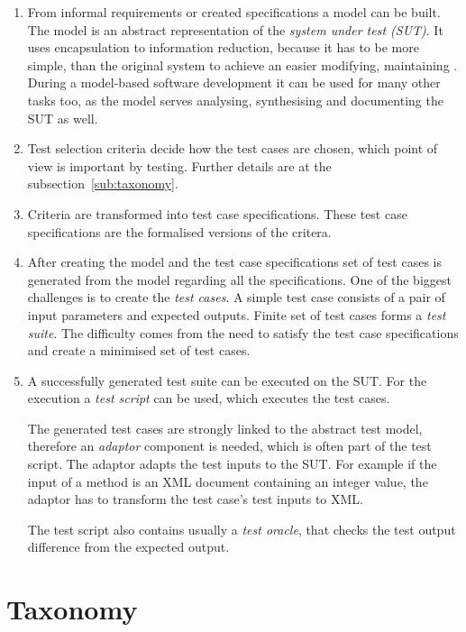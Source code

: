 \begin{enumerate}
    \item From informal requirements or created specifications a model can be built. The model is an abstract representation of the \textit{system under test (SUT)}. It uses encapsulation to information reduction, because it has to be more simple, than the original system to achieve an easier modifying, maintaining \cite{mbttestcasegeneration}. During a model-based software development it can be used for many other tasks too, as the model serves analysing, synthesising and documenting the SUT as well.
     \item Test selection criteria decide how the test cases are chosen, which point of view is important by testing. Further details are at the subsection~\ref{sub:taxonomy}.
     \item Criteria are transformed into test case specifications. These test case specifications are the formalised versions of the critera.
     \item After creating the model and the test case specifications set of test cases is generated from the model regarding all the specifications. One of the biggest challenges is to create the \textit{test cases}. A simple test case consists of a pair of input parameters and expected outputs. Finite set of test cases forms a \textit{test suite}. The difficulty comes from the need to satisfy the test case specifications and create a minimised set of test cases.
     \item A successfully generated test suite can be executed on the SUT. For the execution a \textit{test script} can be used, which executes the test cases.
     
     The generated test cases are strongly linked to the abstract test model, therefore an \textit{adaptor} component is needed, which is often part of the test script. The adaptor adapts the test inputs to the SUT. For example if the input of a method is an XML document containing an integer value, the adaptor has to transform the test case's test inputs to XML.
     
     The test script also contains usually a \textit{test oracle}, that checks the test output difference from the expected output.
\end{enumerate}

\section{Taxonomy}
\label{sec:taxonomy}

